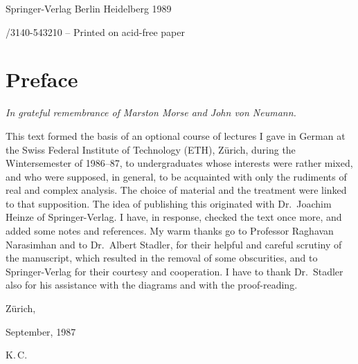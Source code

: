 \medskip\noindent \textcopyright{} Springer-Verlag Berlin Heidelberg 1989

\medskip{}/3140-543210 -- Printed on acid-free paper

\cleardoublepage
\chapter*{Preface}
{\itshape In grateful remembrance of Marston Morse and John von Neumann.}

\medskip
\noindent This text formed the basis of an optional course of lectures I gave in German
at the Swiss Federal Institute of Technology (ETH), Z\"urich, during the
Wintersemester of 1986--87, to undergraduates whose interests were rather mixed,
and who were supposed, in general, to be acquainted with only the rudiments of real
and complex analysis. The choice of material and the treatment were linked to that
supposition. The idea of publishing this originated with Dr.~Joachim Heinze of
Springer-Verlag. I have, in response, checked the text once more, and added some
notes and references. My warm thanks go to Professor Raghavan Narasimhan and to
Dr.~Albert Stadler, for their helpful and careful scrutiny of the manuscript, which
resulted in the removal of some obscurities, and to Springer-Verlag for their
courtesy and cooperation. I have to thank Dr.~Stadler also for his assistance with
the diagrams and with the proof-reading.

\medskip
\noindent Z\"urich,\par
\noindent September, 1987\par
\noindent K.\,C.

\cleardoublepage
\tableofcontents
